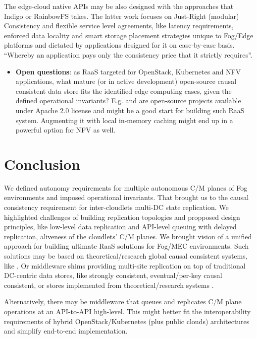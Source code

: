 \documentclass[conference]{IEEEtran}
\begin{document}
The edge-cloud native APIs may be also designed with the approaches that
Indigo\cite{b10} or RainbowFS\cite{b7} takes. The latter work focuses on
Just-Right (modular) Consistency and flexible service level agreements, like
latency requirements, enforced data locality and smart storage placement
strategies unique to Fog/Edge platforms and dictated by applications designed
for it on case-by-case basis. ``Whereby an application pays only the
consistency price that it strictly requires''\cite{b7}.

\begin{itemize}
  \item \textbf{Open questions}: as RaaS targeted for OpenStack, Kubernetes and
    NFV applications, what mature (or in active development) open-source causal
    consistent data store fits the identified edge computing cases, given the
    defined operational invariants? E.g.\cite{b12}\cite{b19}\cite{b20} and
    \cite{b23} are open-source projects available under Apache 2.0 license and
    might be a good start for building such RaaS system. Augmenting it with
    local in-memory caching might end up in a powerful option for NFV as well.
\end{itemize}

\section{Conclusion}
We defined autonomy requirements for multiple autonomous C/M planes of Fog
environments and imposed operational invariants. That brought us to the causal
consistency requirement for inter-cloudlets multi-DC state replication. We
highlighted challenges of building replication topologies and propposed design
principles, like low-level data replication and API-level queuing with delayed
replication, aliveness of the cloudlets' C/M planes. We brought vision of a
unified approach for building ultimate RaaS solutions for Fog/MEC environments.
Such solutions may be based on theoretical/research global causal consistent
systems, like \cite{b11}\cite{b12}. Or middleware shims providing multi-site
replication on top of traditional DC-centric data stores, like strongly
consistent\cite{b22}, eventual/per-key causal consistent\cite{b19}\cite{b20},
or stores implemented from theoretical/research systems
\cite{b1}\cite{b2}\cite{b7}\cite{b10}\cite{b13}\cite{b23}.

Alternatively, there may be middleware that queues and replicates C/M plane
operations at an API-to-API high-level. This might better fit the
interoperability requirements of hybrid OpenStack/Kubernetes (plus public
clouds) architectures and simplify end-to-end implementation.
\end{document}
